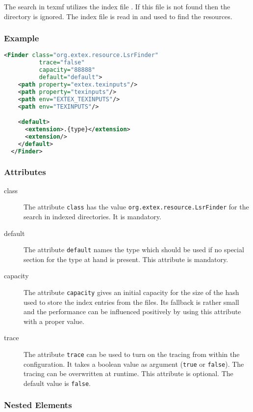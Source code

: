 The search in texmf utilizes the index file . If this file
is not found then the directory is ignored. The index file 
is read in and used to find the resources.

\subsubsection*{Example}

\begin{lstlisting}[language=XML]
  <Finder class="org.extex.resource.LsrFinder"
          trace="false"
          capacity="88888"
          default="default">
    <path property="extex.texinputs"/>
    <path property="texinputs"/>
    <path env="EXTEX_TEXINPUTS"/>
    <path env="TEXINPUTS"/>

    <default>
      <extension>.{type}</extension>
      <extension/>
    </default>
  </Finder>
\end{lstlisting}

\subsubsection*{Attributes}
\begin{description}
\item[class] The attribute \texttt{class} has the value
  \texttt{org.extex.resource.LsrFinder} for the search in indexed
  directories. It is mandatory.
\item[default] The attribute \texttt{default} names the type which
  should be used if no special section for the type at hand is
  present. This attribute is mandatory.
\item[capacity] The attribute \texttt{capacity} gives an initial
  capacity for the size of the hash used to store the index entries
  from the  files. Its fallback is rather small and the
  performance can be influenced positively by using this attribute
  with a proper value.
\item[trace] The attribute \texttt{trace} can be used to turn on the
  tracing from within the configuration. It takes a boolean value as
  argument (\texttt{true} or \texttt{false}). The tracing can be
  overwritten at runtime. This attribute is optional. The default
  value is \texttt{false}.
\end{description}

\subsubsection*{Nested Elements}

